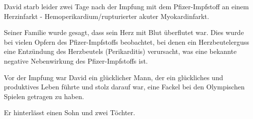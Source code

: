 David starb leider zwei Tage nach der Impfung mit dem Pfizer-Impfstoff an einem
Herzinfarkt - Hemoperikardium/rupturierter akuter Myokardinfarkt.

Seiner Familie wurde gesagt, dass sein Herz mit Blut überflutet war. Dies wurde
bei vielen Opfern des Pfizer-Impfstoffs beobachtet, bei denen ein
Herzbeutelerguss eine Entzündung des Herzbeutels (Perikarditis) verursacht, was
eine bekannte negative Nebenwirkung des Pfizer-Impfstoffs ist.

Vor der Impfung war David ein glücklicher Mann, der ein glückliches und
produktives Leben führte und stolz darauf war, eine Fackel bei den Olympischen
Spielen getragen zu haben.

Er hinterlässt einen Sohn und zwei Töchter.
